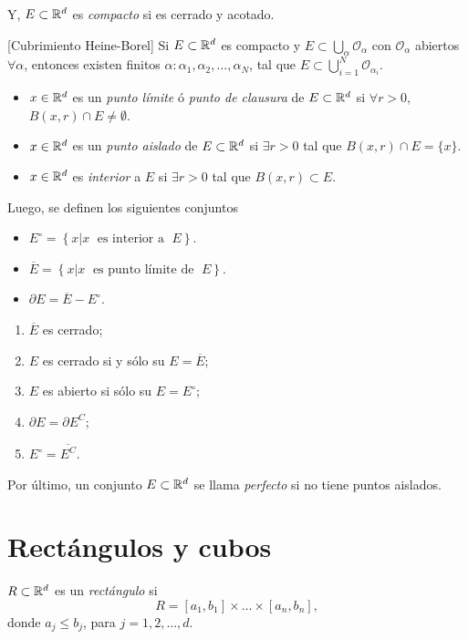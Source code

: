 Y, $E \subset \mathbb{R}^d $ es \emph{compacto} si es cerrado y acotado.


\begin{teorema}{}[Cubrimiento Heine-Borel]
Si $E \subset \mathbb{R}^d$ es compacto y $E\subset \bigcup\limits_{\alpha} \mathcal{O}_{\alpha}$
con $\mathcal{O}_{\alpha}$ abiertos $\forall \alpha$, entonces existen finitos $\alpha:\alpha_1,\alpha_2, \ldots,\alpha_N$, tal que 
$E \subset \bigcup\limits_{i=1}^N \mathcal{O}_{\alpha_i}$.
\end{teorema}

\begin{itemize}
    \item $x \in \mathbb{R}^d$ es un \emph{punto l\'imite} \'o \emph{punto de clausura} de $E\subset \mathbb{R}^d$
    si $\forall r>0$,\; $B(x,r)\cap E \neq \emptyset$.
    \item $x \in \mathbb{R}^d$ es un \emph{punto aislado} de $E\subset \mathbb{R}^d$ si $\exists r>0$ tal que $B(x,r)\cap E=\{x\}$.
    \item $x \in \mathbb{R}^d$ es \emph{interior} a $E$ si $\exists r>0$ tal que $B(x,r) \subset E$.
\end{itemize}

Luego, se definen los siguientes conjuntos 
\begin{itemize}
    \item $E^{\circ}=\left\{x| x \;\mbox{ es interior a }\; E \right\}$.
    \item $\overline{E}=\left\{x| x \;\mbox{ es punto l\'imite de }\; E \right\}$.
    \item     $\partial E=\overline{E}-E^{\circ}$.
\end{itemize}

\begin{ejercicio}{}
\begin{enumerate}
    \item $\overline{E}$ es cerrado;
    \item $E$ es cerrado si y s\'olo su $E=\overline{E}$;
    \item $E$ es abierto si  s\'olo su $E=E^{\circ}$;
    \item $\partial E = \partial E^C$;
    \item $E^{\circ} = \overline{E^C}$.
\end{enumerate}
\end{ejercicio}

Por \'ultimo, un conjunto $E \subset \mathbb{R}^d$ se llama \emph{perfecto} si no tiene puntos aislados.

\section{Rect\'angulos y cubos}
\begin{definicion}{}
$R \subset \mathbb{R}^d$ es un \emph{rect\'angulo} si 
\[
R=[a_1,b_1]\times\ldots\times [a_n,b_n],
\]
donde $a_j\leq b_j$, para $j=1,2,\ldots,d$.
\end{definicion}

